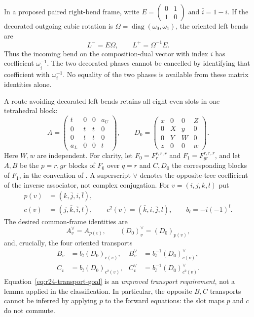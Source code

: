 In a proposed paired right-bend frame, write
$E=\left(\begin{smallmatrix}0&1\\1&0\end{smallmatrix}\right)$ and
$\bar i=1-i$. If the decorated outgoing cubic rotation is
$\Omega=\operatorname{diag}(\omega_0,\omega_1)$, the oriented left bends
are
\[
 L^-=E\Omega,\qquad L^+=\Omega^{-1}E.
\]
Thus the incoming bend on the composition-dual vector with index $i$
has coefficient $\omega_{\bar i}^{-1}$. The two decorated phases cannot
be cancelled by identifying that coefficient with
$\omega_i^{-1}$. No equality of the two phases is available from these
matrix identities alone.

A route avoiding decorated left bends retains all eight even slots in
one tetrahedral block:
\[
 A=\begin{pmatrix}
 t&0&0&a_U\\0&t&t&0\\0&t&t&0\\a_L&0&0&t
 \end{pmatrix},\qquad
 D_0=\begin{pmatrix}
 x&0&0&Z\\0&X&y&0\\0&Y&W&0\\z&0&0&w
 \end{pmatrix}.
\]
Here $W,w$ are independent. For clarity, let
$F_0=F^{r,r,r}_r$ and $F_1=F^{r,r,r}_{gr}$, and let $A,B$ be the
$p=r,gr$ blocks of $F_0$ over $q=r$ and $C,D_0$ the corresponding
blocks of $F_1$, in the convention of \cite[pp.~528--530]{EIP}.
A superscript $\vee$ denotes the opposite-tree coefficient of the
inverse associator, not complex conjugation. For $v=(i,j,k,l)$ put
\[
\begin{split}
 p(v)&=(k,\bar j,i,\bar l),\\
 c(v)&=(j,\bar k,\bar i,l),\qquad
 c^2(v)=(\bar k,i,\bar j,l),\qquad b_l=-i(-1)^l.
\end{split}
\]
The desired common-frame identities are
\[
 A^\vee_v=A_{p(v)},\qquad (D_0)^\vee_v=(D_0)_{p(v)},
\]
and, crucially, the four oriented transports
\begin{equation}\label{eq:r24-transport-goal}
\begin{aligned}
 B_v&=b_l(D_0)_{c(v)},&
 B^\vee_v&=b_l^{-1}(D_0)^\vee_{c(v)},\\
 C_v&=b_l(D_0)_{c^2(v)},&
 C^\vee_v&=b_l^{-1}(D_0)^\vee_{c^2(v)}.
\end{aligned}
\end{equation}
Equation~\eqref{eq:r24-transport-goal} is an \emph{unproved transport
requirement}, not a lemma applied in the classification. In particular,
the opposite $B,C$ transports cannot be inferred by applying $p$ to
the forward equations: the slot maps $p$ and $c$ do not commute.

